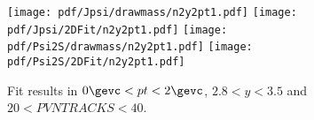 \begin{figure}[H]
\begin{center}
\texttt{[image: pdf/Jpsi/drawmass/n2y2pt1.pdf]}
\texttt{[image: pdf/Jpsi/2DFit/n2y2pt1.pdf]}
\vspace*{-0.5cm}
\texttt{[image: pdf/Psi2S/drawmass/n2y2pt1.pdf]}
\texttt{[image: pdf/Psi2S/2DFit/n2y2pt1.pdf]}
\vspace*{-0.5cm}
\end{center}
\caption{Fit results in $0\gevc<pt<2\gevc$, $2.8<y<3.5$ and $20<PVNTRACKS<40$.}
\label{Fitn2y2pt1}
\end{figure}

